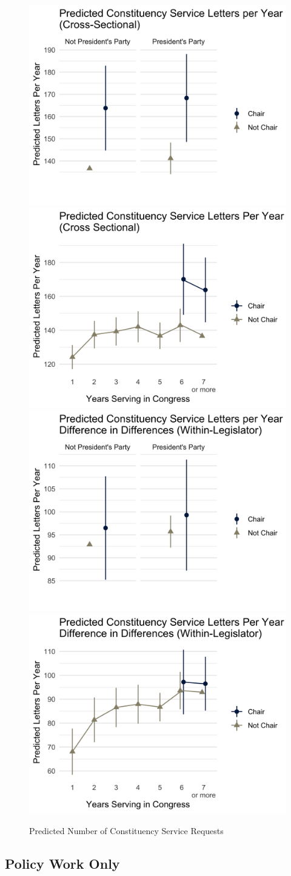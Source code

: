 \begin{figure}[hbt!]
\centering
\caption{Predicted Number of Constituency Service Requests} \label{f:m-con-predicted}
\includegraphics[width = .49\textwidth]{figs/m-con-predicted-1}
\includegraphics[width = .49\textwidth]{figs/m-con-predicted-2}
\includegraphics[width = .49\textwidth]{figs/m-con-predicted-3}
\includegraphics[width = .49\textwidth]{figs/m-con-predicted-4}

\end{figure}

\subsection{Policy Work Only}

